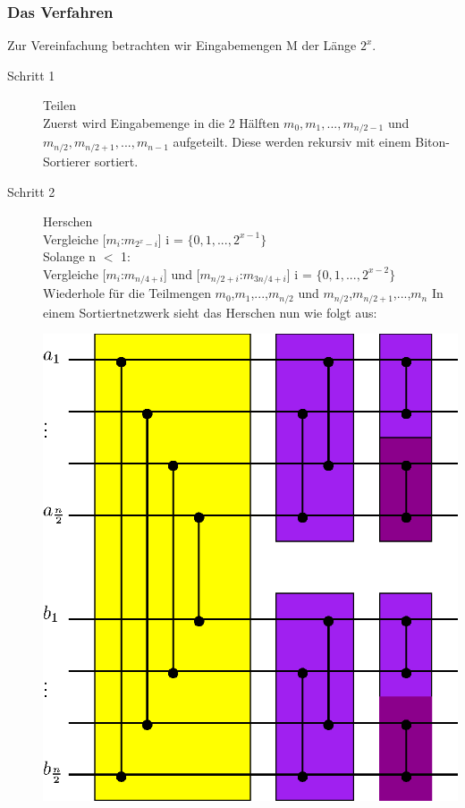 \documentclass[11pt]{article}
\begin{document}
\subsubsection{Das Verfahren}
Zur Vereinfachung betrachten wir Eingabemengen M der Länge $2^x$.\\
\begin{description}
\item[Schritt 1] Teilen\\Zuerst wird Eingabemenge in die 2 Hälften $m_0, m_1, ..., m_{n/2-1}$ und $m_{n/2}, m_{n/2+1}, ..., m_{n-1}$ aufgeteilt. Diese werden rekursiv mit einem Biton-Sortierer sortiert.
\item[Schritt 2] Herschen\\Vergleiche [$m_i$:$m_{2^x-i}$] i = $\{0, 1, ..., 2^{x-1}\}$\\Solange n $<$ 1:\\ Vergleiche [$m_i$:$m_{n/4+i}$] und [$m_{n/2+i}$:$m_{3n/4+i}$] i = $\{0, 1, ..., 2^{x-2}\}$\\Wiederhole für die Teilmengen $m_0$,$m_1$,...,$m_{n/2}$ und $m_{n/2}$,$m_{n/2+1}$,...,$m_{n}$
In einem Sortiertnetzwerk sieht das Herschen nun wie folgt aus:\\
\begin{center}
\includegraphics[scale=0.8]{bitonmischer.eps}
\end{center}
\end{description}
\end{document}
